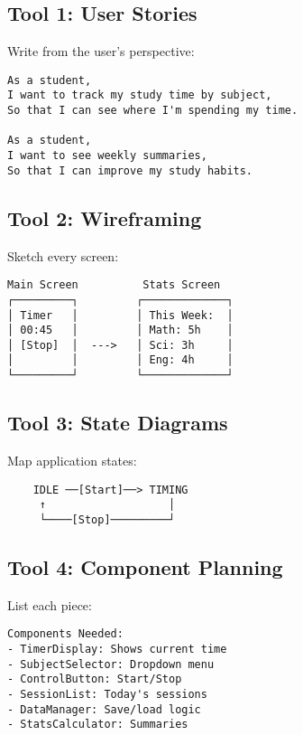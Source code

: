 \documentclass[
  letterpaper,
  DIV=11,
  numbers=noendperiod,
  oneside]{scrreprt}
\begin{document}
\subsection{Tool 1: User Stories}\label{tool-1-user-stories}

Write from the user's perspective:

\begin{verbatim}
As a student,
I want to track my study time by subject,
So that I can see where I'm spending my time.

As a student,
I want to see weekly summaries,
So that I can improve my study habits.
\end{verbatim}

\subsection{Tool 2: Wireframing}\label{tool-2-wireframing}

Sketch every screen:

\begin{verbatim}
Main Screen          Stats Screen
┌─────────┐         ┌─────────────┐
│ Timer   │         │ This Week:  │
│ 00:45   │         │ Math: 5h    │
│ [Stop]  │  --->   │ Sci: 3h     │
│         │         │ Eng: 4h     │
└─────────┘         └─────────────┘
\end{verbatim}

\subsection{Tool 3: State Diagrams}\label{tool-3-state-diagrams}

Map application states:

\begin{verbatim}
    IDLE ──[Start]──> TIMING
     ↑                   │
     └────[Stop]─────────┘
\end{verbatim}

\subsection{Tool 4: Component Planning}\label{tool-4-component-planning}

List each piece:

\begin{verbatim}
Components Needed:
- TimerDisplay: Shows current time
- SubjectSelector: Dropdown menu
- ControlButton: Start/Stop
- SessionList: Today's sessions
- DataManager: Save/load logic
- StatsCalculator: Summaries
\end{verbatim}
\end{document}
